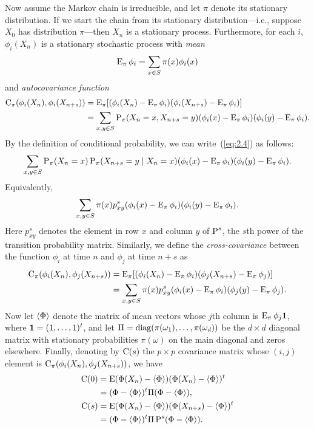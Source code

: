 Now assume the Markov chain is irreducible, and let $\pi$ denote its stationary distribution.
If we start the chain from its stationary distribution---i.e., suppose $X_0$ has
distribution $\pi$---then $X_n$ is a stationary process. 
Furthermore, for each $i$, $\phi_i(X_n)$ is a stationary stochastic process with
\emph{mean}
\[
\E_\pi\phi_i = \sum_{x\in S} \pi(x)\phi_i(x)
\]
and \emph{autocovariance function}
\begin{align}
\C_\pi (\phi_i(X_n),  \phi_i (X_{n+s})) 
&= \E_\pi[(\phi_i(X_n) - \E_\pi\phi_i)(\phi_i(X_{n+s}) - \E_\pi\phi_i)]\\
&= \sum_{x, y\in S} \P_\pi(X_n = x, X_{n+s} = y) (\phi_i(x)- \E_\pi\phi_i)(\phi_i(y) - \E_\pi\phi_i).\nonumber
\end{align}
By the definition of conditional probability, we can write~(\ref{eq:2.4}) as follows:
\[
\sum_{x, y\in S} \P_\pi(X_n = x) \P_\pi(X_{n+s} = y\mid X_n = x) (\phi_i(x)-
\E_\pi\phi_i)(\phi_i(y) - \E_\pi\phi_i).
\]
Equivalently,
\[
\sum_{x, y\in S} \pi(x)p^s_{xy} (\phi_i(x)-\E_\pi\phi_i)(\phi_i(y) - \E_\pi\phi_i).
\]
Here $p^s_{xy}$ denotes the element in row $x$ and column $y$ of $\P^s$, the
$s$th power of the transition probability matrix. 
Similarly, we define the \emph{cross-covariance} between the function 
$\phi_i$ at time $n$ and $\phi_j$ at time $n+s$ as
\begin{align}
\C_\pi (\phi_i(X_n),  \phi_j (X_{n+s})) 
&= \E_\pi[(\phi_i(X_n) - \E_\pi\phi_i)(\phi_j(X_{n+s}) - \E_\pi\phi_j)]\nonumber\\
&= \sum_{x, y\in S} \pi(x)p^s_{xy} (\phi_i(x)-\E_\pi\phi_i)(\phi_j(y) - \E_\pi\phi_j).
\end{align}
Now let $\<\Phi\>$ denote the matrix of mean vectors whose $j$th column is 
$\E_\pi\phi_j\one$, where $\one = (1,\dots, 1)^t$,
and let $\Pi = \diag(\pi(\omega_1),\dots, \pi(\omega_d))$ be the $d \times d$
diagonal matrix with stationary probabilities $\pi(\omega)$
on the main diagonal and zeros elsewhere. 
Finally, denoting by $\C(s)$ the $p \times p$ covariance matrix
whose $(i,j)$ element is $\C_\pi(\phi_i(X_n), \phi_j(X_{n+s}))$, we have
\begin{align*}
\C(0) &= \E(\Phi(X_n) - \<\Phi\>)(\Phi(X_n) - \<\Phi\>)^t\\
&= (\Phi - \<\Phi\>)^t\Pi (\Phi-\<\Phi\>), \\
\C(s) &= \E(\Phi(X_n) - \<\Phi\>)(\Phi(X_{n+s}) - \<\Phi\>)^t\\
&= (\Phi - \<\Phi\>)^t \Pi \P^s (\Phi - \<\Phi\>).
\end{align*}

